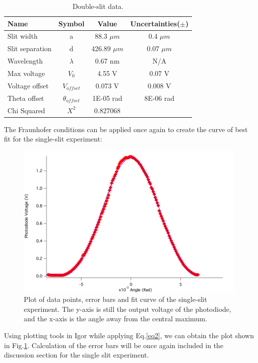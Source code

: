 \documentclass[prb,preprint]{revtex4-1}
\begin{document}
\begin{table}[h]
\centering
\caption{Double-slit data. }
\begin{ruledtabular}
\begin{tabular}{ l c c c}
Name & Symbol & Value & Uncertainties($\pm$)\\
\hline
Slit width & a & 88.3 $\mu m$ & 0.4 $\mu m$\\
Slit separation & d & 426.89 $\mu m$ & 0.07 $\mu m$\\
Wavelength & $\lambda$ & 0.67 nm & N/A \\
Max voltage & $V_0$ & 4.55 V & 0.07 V\\
Voltage offset & $V_{offset}$ & 0.073 V & 0.008 V\\
Theta offset &$ \theta_{offset}$ & 1E-05 rad & 8E-06 rad \\
\hline
Chi Squared & $X^2$ & 0.827068&
\end{tabular}
\end{ruledtabular}
\label{data}
\end{table}

The Fraunhofer conditions can be applied once again to create  the curve of best fit for the single-slit experiment: 

\begin{figure}[h]
\centering
\includegraphics[width=6.6in]{single.png}
\caption{Plot of data points, error bars and fit curve of the single-slit experiment. The y-axis is still the output voltage of the photodiode, and the x-axis is the angle away from the central maximum.}
\label{single}
\end{figure}

Using plotting tools in Igor while applying Eq.\ref{eq2}, we can obtain the plot shown in Fig.\ref{single}. Calculation of the error bars will be once again included in the discussion section for the single slit experiment.
\end{document}
